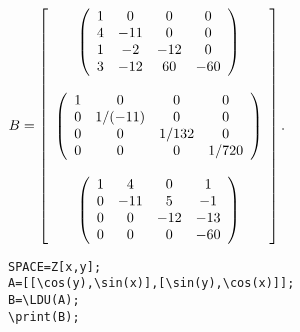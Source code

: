 {$B = \left[\begin{array}{c}
\left(\begin{array}{cccc}1& 0&   0&   0  \\
 4& -11& 0&   0 \\
 1& -2&  -12& 0  \\
 3& -12& 60&  -60\\ 
\end{array}\right) \\ 
\null \\ 
\left(\begin{array}{cccc}1& 0&         0&       0      \\
 0& 1/(-11)& 0&       0      \\
 0& 0&         1/132& 0      \\
 0& 0&         0&       1/720\\ 
\end{array}\right) \\ 
\null \\
\left(\begin{array}{cccc}1& 4&   0&   1  \\
 0& -11& 5&   -1 \\
 0& 0&   -12& -13\\
 0& 0&   0&   -60\\ 
\end{array}\right)\\
 \end{array}\right].$
} 

\begin{verbatim}
SPACE=Z[x,y];
A=[[\cos(y),\sin(x)],[\sin(y),\cos(x)]];
B=\LDU(A);
\print(B);
\end{verbatim}

